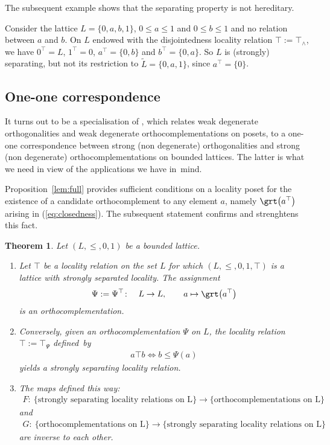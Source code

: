 \documentclass[10pt,a4paper]{amsart}
\numberwithin{equation}{section}
\newtheorem{Theorem}{Theorem}[section]
\newcommand{\loc}{locality\xspace}
\newcommand{\pone}{separating\xspace }
\def \ptwob {separated\xspace }
\begin{document}
The subsequent example shows that the \pone property is not hereditary.
	\begin{Example} Consider the lattice
	$L=\{0,a,b,1\}$, $0\leq a\leq 1$ and $0\leq b\leq 1$ and no relation between $a$ and $b$. On $L$ endowed with the disjointedness \loc relation $\top:=\top_\wedge$, we have $0^\top=L$, $1^\top =0$, $a^\top=\{0,b\}$ and $b^\top=\{0,a\}$. So $L$ is (strongly) \pone, but not
	its restriction to $\widetilde L=\{0,a,1\}$, since $a^\top =\{0\}$.
\end{Example}

\subsection {One-one correspondence}
	 It turns out to be a specialisation of \cite[Theorem 3.1]{CM}, which relates weak degenerate orthogonalities and weak degenerate orthocomplementations on posets, to a one-one correspondence between strong (non degenerate) orthogonalities and strong (non degenerate) orthocomplementations on bounded lattices. The latter is what we need in view of the applications we have in~mind.

Proposition~\ref{lem:full} provides sufficient conditions on a locality poset for the existence of a candidate orthocomplement to any element $a$, namely $\grt \big(a^\top\big)$ arising in (\ref{eq:closedness}). The subsequent statement confirms and strenghtens this fact.


\begin{Theorem} \label{thm:complement_strongly_local}
Let $(L, \leq, 0, 1)$ be a bounded lattice.
\begin{enumerate}\itemsep=0pt
	\item Let $\top$ be a \loc relation on the set $L$ for which $(L, \leq, 0,1, \top) $ is a lattice with strongly \ptwob \loc. The assignment
	\begin{gather*}%
	\Psi:=\Psi^\top\colon\quad L\to L,\qquad a\mapsto \grt \big(a^\top\big)
	\end{gather*}
	is an orthocomplementation.
	\item Conversely, given an orthocomplementation $\Psi $ on $L$, the \loc relation $\top:=\top_\Psi$ defi\-ned~by
	\begin{gather*}%
a\top b\Longleftrightarrow b \leq \Psi(a)
\end{gather*}
	yields a strongly \pone \loc relation.
	\item The maps defined this way:
	\begin{gather*}
F\colon\ \{\text{strongly \pone \loc relations on L}\}\to
\{\text{orthocomplementations on L}\}
\end{gather*}
	and
	\begin{gather*}
 G\colon\ \{\text{orthocomplementations on L}\} \to
 \{\text{strongly \pone \loc relations on L}\}
 \end{gather*}
	are inverse to each other.
\end{enumerate}
\end{Theorem}
\end{document}
